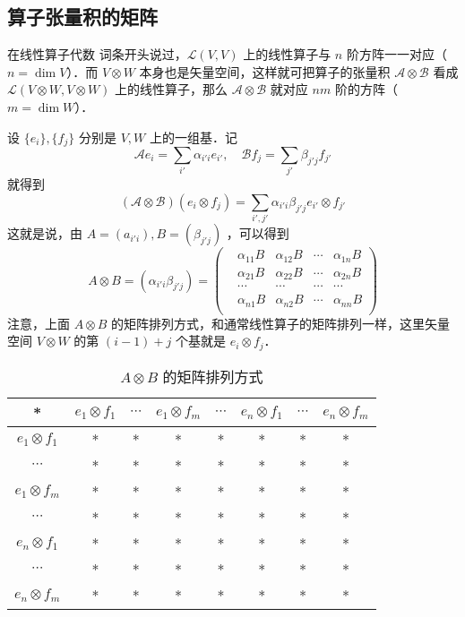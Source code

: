 \subsection{算子张量积的矩阵}
在线性算子代数 词条开头说过，$\mathcal L(V,V)$ 上的线性算子与 $n$ 阶方阵一一对应（ $n=\dim V$）．而 $V\otimes W$ 本身也是矢量空间，这样就可把算子的张量积 $\mathcal A\otimes \mathcal B$ 看成 $\mathcal L(V\otimes W,V\otimes W)$ 上的线性算子，那么 $\mathcal A\otimes \mathcal B$ 就对应 $nm$ 阶的方阵（$m=\dim W$）．

设 $\{e_i\},\{f_j\}$ 分别是 $V,W$ 上的一组基．记
\begin{equation}
\mathcal Ae_i=\sum_{i'}\alpha_{i'i}e_{i'},\quad \mathcal Bf_j=\sum_{j'}\beta_{j'j}f_{j'}
\end{equation}
就得到
\begin{equation}
(\mathcal A\otimes \mathcal B)(e_i\otimes f_j)=\sum_{i',j'}\alpha_{i'i}\beta_{j'j}e_{i'}\otimes f_{j'}
\end{equation}
这就是说，由 $A=(a_{i'i}),B=(\beta_{j'j})$ ，可以得到
\begin{equation}
A\otimes B=(\alpha_{i'i}\beta_{j'j})=
\begin{pmatrix}
&\alpha_{11}B&\alpha_{12}B&\cdots&\alpha_{1n}B\\
&\alpha_{21}B&\alpha_{22}B&\cdots&\alpha_{2n}B\\
&\cdots&\cdots&\cdots&\cdots\\
&\alpha_{n1}B&\alpha_{n2}B&\cdots&\alpha_{nn}B\\
\end{pmatrix}
\end{equation}
注意，上面 $A\otimes B$ 的矩阵排列方式，和通常线性算子的矩阵排列一样，这里矢量空间 $V\otimes W$ 的第 $(i-1)+j$ 个基就是 $e_i\otimes f_j$．

\begin{table}[ht]
\centering
\caption{ $A\otimes B$ 的矩阵排列方式}\label{TPofLO_tab1}
\begin{tabular}{|c|c|c|c|c|c|c|c|}
\hline
* & $e_1\otimes f_1$ & $\cdots$ & $e_1\otimes f_m$ & $\cdots$ & $e_n\otimes f_1$ & $\cdots$ & $e_n\otimes f_m$ \\
\hline
$e_1\otimes f_1$ & * & * & * & * & * & * & * \\
\hline
$\cdots$ & * & * & * & * & * & * & * \\
\hline
$e_1\otimes f_m$ & * & * & * & * & * & * & * \\
\hline
$\cdots$ & * & * & * & * & * & * & * \\
\hline
$e_n\otimes f_1$ & * & * & * & * & * & * & * \\
\hline
$\cdots$ & * & * & * & * & * & * & * \\
\hline
$e_n\otimes f_m$ & * & * & * & * & * & * & * \\
\hline
\end{tabular}
\end{table}

